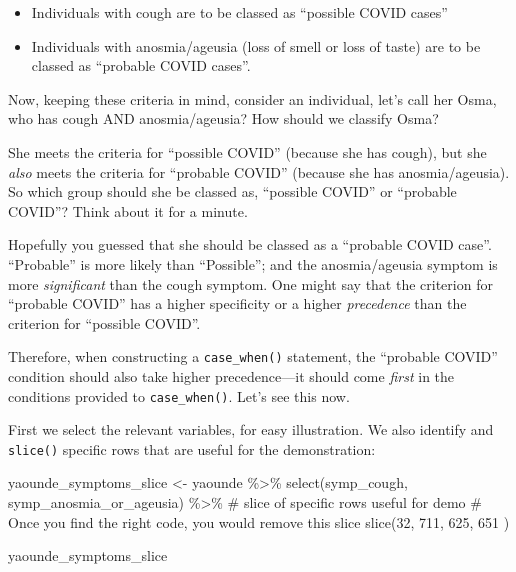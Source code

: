 \documentclass[
  letterpaper,
  DIV=11,
  numbers=noendperiod]{scrreprt}
\newenvironment{Shaded}{\begin{snugshade}}{\end{snugshade}}
\newcommand{\CommentTok}[1]{\textcolor[rgb]{0.37,0.37,0.37}{#1}}
\newcommand{\DecValTok}[1]{\textcolor[rgb]{0.68,0.00,0.00}{#1}}
\newcommand{\FunctionTok}[1]{\textcolor[rgb]{0.28,0.35,0.67}{#1}}
\newcommand{\NormalTok}[1]{\textcolor[rgb]{0.00,0.23,0.31}{#1}}
\newcommand{\OtherTok}[1]{\textcolor[rgb]{0.00,0.23,0.31}{#1}}
\newcommand{\SpecialCharTok}[1]{\textcolor[rgb]{0.37,0.37,0.37}{#1}}
\providecommand{\tightlist}{%
  \setlength{\itemsep}{0pt}\setlength{\parskip}{0pt}}\usepackage{longtable,booktabs,array}
\begin{document}
\begin{itemize}
\tightlist
\item
  Individuals with cough are to be classed as ``possible COVID cases''
\item
  Individuals with anosmia/ageusia (loss of smell or loss of taste) are
  to be classed as ``probable COVID cases''.
\end{itemize}

Now, keeping these criteria in mind, consider an individual, let's call
her Osma, who has cough AND anosmia/ageusia? How should we classify
Osma?

She meets the criteria for ``possible COVID'' (because she has cough),
but she \emph{also} meets the criteria for ``probable COVID'' (because
she has anosmia/ageusia). So which group should she be classed as,
``possible COVID'' or ``probable COVID''? Think about it for a minute.

Hopefully you guessed that she should be classed as a ``probable COVID
case''. ``Probable'' is more likely than ``Possible''; and the
anosmia/ageusia symptom is more \emph{significant} than the cough
symptom. One might say that the criterion for ``probable COVID'' has a
higher specificity or a higher \emph{precedence} than the criterion for
``possible COVID''.

Therefore, when constructing a \texttt{case\_when()} statement, the
``probable COVID'' condition should also take higher precedence---it
should come \emph{first} in the conditions provided to
\texttt{case\_when()}. Let's see this now.

First we select the relevant variables, for easy illustration. We also
identify and \texttt{slice()} specific rows that are useful for the
demonstration:

\begin{Shaded}
\begin{Highlighting}[]
\NormalTok{yaounde\_symptoms\_slice }\OtherTok{\textless{}{-}} 
\NormalTok{  yaounde }\SpecialCharTok{\%\textgreater{}\%} 
  \FunctionTok{select}\NormalTok{(symp\_cough, symp\_anosmia\_or\_ageusia) }\SpecialCharTok{\%\textgreater{}\%} 
  \CommentTok{\# slice of specific rows useful for demo }
  \CommentTok{\# Once you find the right code, you would remove this slice}
  \FunctionTok{slice}\NormalTok{(}\DecValTok{32}\NormalTok{, }\DecValTok{711}\NormalTok{, }\DecValTok{625}\NormalTok{, }\DecValTok{651}\NormalTok{ )}

\NormalTok{yaounde\_symptoms\_slice}
\end{Highlighting}
\end{Shaded}
\end{document}
